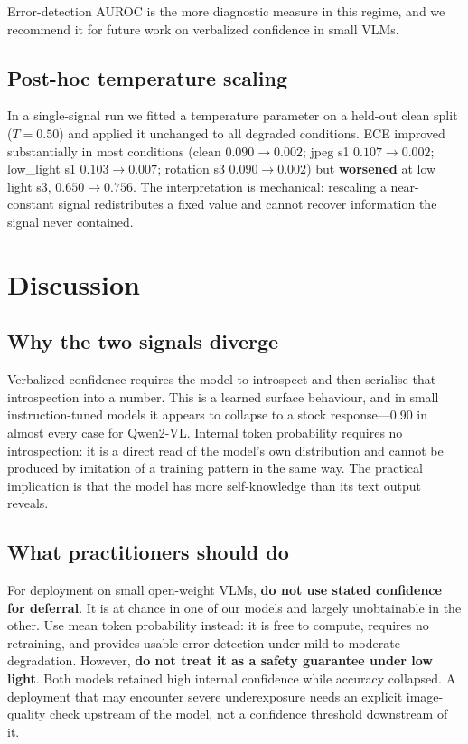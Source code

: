 \documentclass[11pt]{article}
\begin{document}
Error-detection AUROC is the more diagnostic measure in this regime, and we
recommend it for future work on verbalized confidence in small VLMs.

\subsection{Post-hoc temperature scaling}

In a single-signal run we fitted a temperature parameter on a held-out clean
split ($T = 0.50$) and applied it unchanged to all degraded conditions. ECE
improved substantially in most conditions (clean $0.090 \rightarrow 0.002$;
jpeg s1 $0.107 \rightarrow 0.002$; low\_light s1 $0.103 \rightarrow 0.007$;
rotation s3 $0.090 \rightarrow 0.002$) but \textbf{worsened} at low light s3,
$0.650 \rightarrow 0.756$. The interpretation is mechanical: rescaling a
near-constant signal redistributes a fixed value and cannot recover information
the signal never contained.

\section{Discussion}

\subsection{Why the two signals diverge}

Verbalized confidence requires the model to introspect and then serialise that
introspection into a number. This is a learned surface behaviour, and in small
instruction-tuned models it appears to collapse to a stock response---0.90 in
almost every case for Qwen2-VL. Internal token probability requires no
introspection: it is a direct read of the model's own distribution and cannot be
produced by imitation of a training pattern in the same way. The practical
implication is that the model has more self-knowledge than its text output
reveals.

\subsection{What practitioners should do}

For deployment on small open-weight VLMs, \textbf{do not use stated confidence
for deferral}. It is at chance in one of our models and largely unobtainable in
the other. Use mean token probability instead: it is free to compute, requires
no retraining, and provides usable error detection under mild-to-moderate
degradation. However, \textbf{do not treat it as a safety guarantee under low
light}. Both models retained high internal confidence while accuracy collapsed.
A deployment that may encounter severe underexposure needs an explicit
image-quality check upstream of the model, not a confidence threshold downstream
of it.
\end{document}
